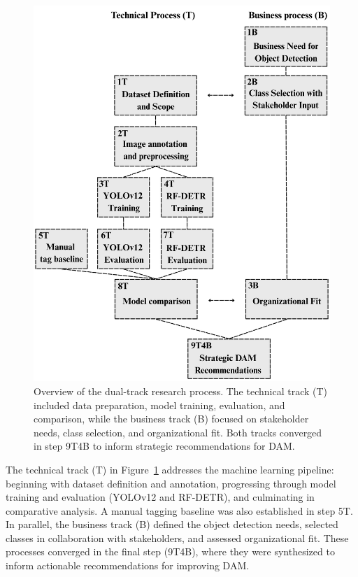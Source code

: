 \documentclass[a4paper,10pt,twocolumn]{article}
\numberwithin{figure}{section}
\numberwithin{table}{section}
\begin{document}
\begin{figure}[htbp]
    \centering
    \includegraphics[width=1\linewidth]{map.png}
    \caption{Overview of the dual-track research process. The technical track (T) included data preparation, model training, evaluation, and comparison, while the business track (B) focused on stakeholder needs, class selection, and organizational fit. Both tracks converged in step 9T4B to inform strategic recommendations for DAM.}
    \label{fig:research-process}
\end{figure}

The technical track (T) in Figure~\ref{fig:research-process} 
addresses the machine learning pipeline: beginning with dataset 
definition and annotation, progressing through model training 
and evaluation (YOLOv12 and RF-DETR), and culminating in 
comparative analysis. A manual tagging baseline was also 
established in step 5T. In parallel, the business track (B) defined the object detection 
needs, selected classes in collaboration with stakeholders, 
and assessed organizational fit.
These processes converged in the final step (9T4B), where they 
were synthesized to inform actionable 
recommendations for improving DAM.
\end{document}

